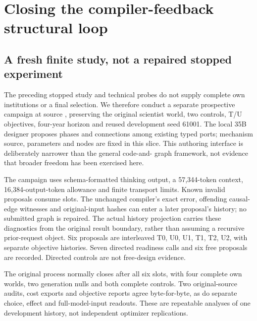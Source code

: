 \section{Closing the compiler-feedback structural loop}
\label{sec:native-workflow-feedback}
\subsection{A fresh finite study, not a repaired stopped experiment}
The preceding stopped study and technical probes do not supply complete own
institutions or a final selection. We therefore conduct a separate prospective
campaign at source , preserving the original scientist world,
two controls, T/U objectives, four-year horizon and reused development seed
61001. The local 35B designer proposes phases and connections among existing
typed ports; mechanism source, parameters and nodes are fixed in this slice.
This authoring interface is deliberately narrower than the general code-and-
graph framework, not evidence that broader freedom has been exercised here.

The campaign uses schema-formatted thinking output, a 57,344-token context,
16,384-output-token allowance and finite transport limits. Known invalid
proposals consume slots. The unchanged compiler's exact error, offending
causal-edge witnesses and original-input hashes can enter a later proposal's
history; no submitted graph is repaired. The actual history projection carries
these diagnostics from the original result boundary, rather than assuming a
recursive prior-request object. Six proposals are interleaved T0, U0, U1, T1,
T2, U2, with separate objective histories. Seven directed readiness calls and
six free proposals are recorded. Directed controls are not free-design evidence.

The original process normally closes after all six slots, with four complete
own worlds, two generation nulls and both complete controls. Two original-source
audits, cost exports and objective reports agree byte-for-byte, as do separate
choice, effect and full-model-input readouts. These are repeatable analyses
of one development history, not independent optimizer replications.

